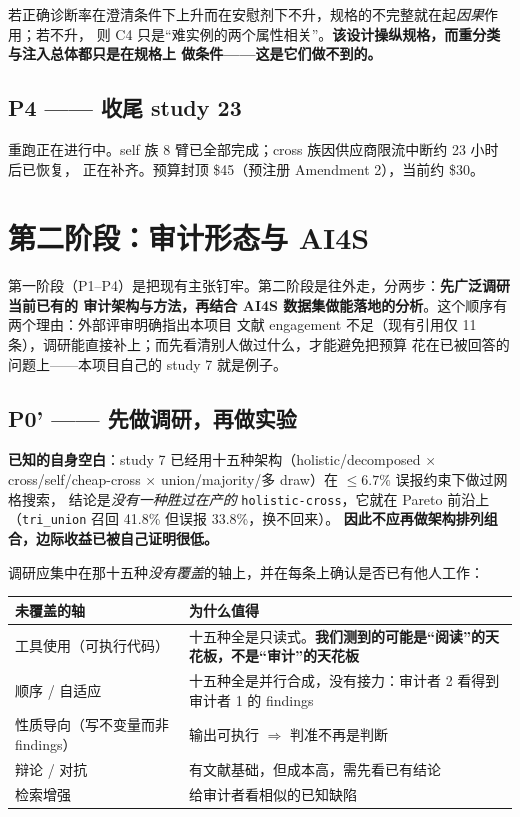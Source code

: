 \documentclass[11pt,a4paper]{article}
\begin{document}
若正确诊断率在澄清条件下上升而在安慰剂下不升，规格的不完整就在起\emph{因果}作用；若不升，
则 C4 只是“难实例的两个属性相关”。\textbf{该设计操纵规格，而重分类与注入总体都只是在规格上
做条件——这是它们做不到的。}

\subsection{P4 —— 收尾 study 23}

重跑正在进行中。self 族 8 臂已全部完成；cross 族因供应商限流中断约 23 小时后已恢复，
正在补齐。预算封顶 \$45（预注册 Amendment 2），当前约 \$30。

\section{第二阶段：审计形态与 AI4S}

第一阶段（P1--P4）是把现有主张钉牢。第二阶段是往外走，分两步：\textbf{先广泛调研当前已有的
审计架构与方法，再结合 AI4S 数据集做能落地的分析}。这个顺序有两个理由：外部评审明确指出本项目
文献 engagement 不足（现有引用仅 11 条），调研能直接补上；而先看清别人做过什么，才能避免把预算
花在已被回答的问题上——本项目自己的 study 7 就是例子。

\subsection{P0' —— 先做调研，再做实验}

\textbf{已知的自身空白}：study 7 已经用十五种架构（holistic/decomposed $\times$
cross/self/cheap-cross $\times$ union/majority/多 draw）在 $\le 6.7\%$ 误报约束下做过网格搜索，
结论是\emph{没有一种胜过在产的} \texttt{holistic-cross}，它就在 Pareto 前沿上
（\texttt{tri\_union} 召回 41.8\% 但误报 33.8\%，换不回来）。
\textbf{因此不应再做架构排列组合，边际收益已被自己证明很低。}

调研应集中在那十五种\emph{没有覆盖}的轴上，并在每条上确认是否已有他人工作：

\begin{center}
\begin{tabular}{@{}lp{7.6cm}@{}}
\toprule
\textbf{未覆盖的轴} & \textbf{为什么值得} \\
\midrule
工具使用（可执行代码） & 十五种全是只读式。\textbf{我们测到的可能是“阅读”的天花板，不是“审计”的天花板} \\
顺序 / 自适应 & 十五种全是并行合成，没有接力：审计者 2 看得到审计者 1 的 findings \\
性质导向（写不变量而非 findings） & 输出可执行 $\Rightarrow$ 判准不再是判断 \\
辩论 / 对抗 & 有文献基础，但成本高，需先看已有结论 \\
检索增强 & 给审计者看相似的已知缺陷 \\
\bottomrule
\end{tabular}
\end{center}
\end{document}
